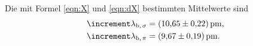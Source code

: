 Die mit Formel \ref{eqn:X} und \ref{eqn:dX} bestimmten Mittelwerte sind 
\begin{align*}
  \increment \lambda_{\text{b,\,}\sigma} &= \SI{10.65\pm0.22}{\pico\meter}, \\
  \increment \lambda_{\text{b,\,}\pi} &= \SI{9.67\pm0.19}{\pico\meter}.
\end{align*}

  
  
  
 
 
 

 
 
 

 
 
 

 
 
 

 
 
 

 
 
 


 



  
  
 
  
  
  
 
  
  
  
 
  
  
  
 
  
  
  
 
  
  
 
